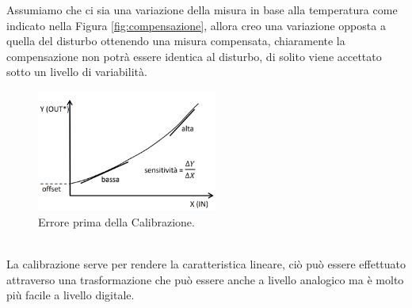 \documentclass[11pt, twocolumn]{article}
\begin{document}
Assumiamo che ci sia una variazione della misura in base alla temperatura come indicato nella Figura \ref{fig:compensazione}, allora creo una variazione opposta a quella del disturbo ottenendo una misura compensata, chiaramente la compensazione non potrà essere identica al disturbo, di solito viene accettato sotto un livello di variabilità.\\
\begin{figure}[!h]
  \centering
  \includegraphics[width=\linewidth,height=4cm]{imgs/calibrazione.png}
  \caption{Errore prima della Calibrazione.}
  \label{fig:calibrazione}
\end{figure}\\
La calibrazione serve per rendere la caratteristica lineare, ciò può essere effettuato attraverso una trasformazione che può essere anche a livello analogico ma è molto più facile a livello digitale.
\end{document}
